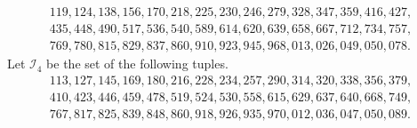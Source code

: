 \documentclass[reqno, 11pt]{amsart}
\numberwithin{equation}{section}
\theoremstyle{definition}
\newcommand{\cI}{\mathcal{I}}
\begin{document}
\begin{align*}
	1 1 9 ,
	1 2 4 ,
	1 3 8 ,
	1 5 6 ,
	1 7 0 ,
	2 1 8 ,
	2 2 5 ,
	2 3 0 ,
	2 4 6 ,
	2 7 9 ,
	3 2 8 ,
	3 4 7 ,
	3 5 9 ,
	4 1 6 ,
	4 2 7 , \\
	4 3 5 ,
	4 4 8 ,
	4 9 0 ,
	5 1 7 ,
	5 3 6 ,
	5 4 0 ,
	5 8 9 ,
	6 1 4 ,
	6 2 0 ,
	6 3 9 ,
	6 5 8 ,
	6 6 7 ,
	7 1 2 ,
	7 3 4 ,
	7 5 7 , \\
	7 6 9 ,
	7 8 0 ,
	8 1 5 ,
	8 2 9 ,
	8 3 7 ,
	8 6 0 ,
	9 1 0 ,
	9 2 3 ,
	9 4 5 ,
	9 6 8 ,
	0 1 3 ,
	0 2 6 ,
	0 4 9 ,
	0 5 0 ,
	0 7 8 .
\end{align*}
Let $\cI_4$ be the set of the following tuples.
\begin{align*}
	1 1 3 ,
	1 2 7 ,
	1 4 5 ,
	1 6 9 ,
	1 8 0 ,
	2 1 6 ,
	2 2 8 ,
	2 3 4 ,
	2 5 7 ,
	2 9 0 ,
	3 1 4 ,
	3 2 0 ,
	3 3 8 ,
	3 5 6 ,
	3 7 9 , \\
	4 1 0 ,
	4 2 3 ,
	4 4 6 ,
	4 5 9 ,
	4 7 8 ,
	5 1 9 ,
	5 2 4 ,
	5 3 0 ,
	5 5 8 ,
	6 1 5 ,
	6 2 9 ,
	6 3 7 ,
	6 4 0 ,
	6 6 8 ,
	7 4 9 , \\
	7 6 7 ,
	8 1 7 ,
	8 2 5 ,
	8 3 9 ,
	8 4 8 ,
	8 6 0 ,
	9 1 8 ,
	9 2 6 ,
	9 3 5 ,
	9 7 0 ,
	0 1 2 ,
	0 3 6 ,
	0 4 7 ,
	0 5 0 ,
	0 8 9 .
\end{align*}
	
\end{document}
